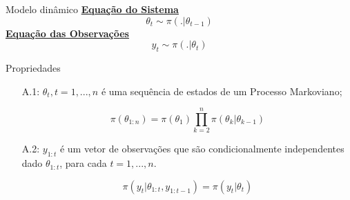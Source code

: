 \documentclass{beamer}
\begin{document}
\begin{frame}{Modelo dinâmico}
\pause
\underline{\textbf{Equação do Sistema}}
$$
\theta_t \sim \pi(.|\theta_{t-1})
$$
\pause
\underline{\textbf{Equação das Observações}}
$$
y_t \sim \pi(.|\theta_{t})
$$

\end{frame}

\begin{frame}{Propriedades}
\begin{center}
\begin{itemize}
\item[A.1:] $\theta_t, t=1,...,n$ é uma sequência de estados de um Processo Markoviano;

$$
\pi(\theta_{1:n}) = \pi(\theta_1) \prod_{k=2}^n \pi(\theta_k|\theta_{k-1}) 
$$

\pause 

\item[A.2:] $y_{1:t}$ é um vetor de observações que são condicionalmente independentes dado $\theta_{1:t}$, para cada $t=1,...,n$.

$$
\pi(y_t|\theta_{1:t},y_{1:t-1}) = \pi(y_t|\theta_{t})
$$

\end{itemize}
\end{center}
\end{frame}
\end{document}
